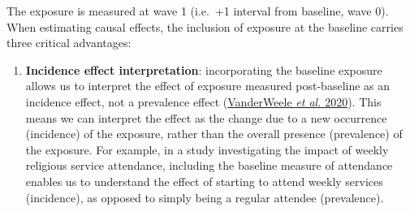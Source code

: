 \documentclass[
  singlecolumn]{article}
\providecommand{\tightlist}{%
  \setlength{\itemsep}{0pt}\setlength{\parskip}{0pt}}\usepackage{longtable,booktabs,array}
\begin{document}
The exposure is measured at wave 1 (i.e.~+1 interval from baseline, wave
0). When estimating causal effects, the inclusion of exposure at the
baseline carries three critical advantages:

\begin{enumerate}
\def\labelenumi{\alph{enumi}.}
\tightlist
\item
  \textbf{Incidence effect interpretation}: incorporating the baseline
  exposure allows us to interpret the effect of exposure measured
  post-baseline as an incidence effect, not a prevalence effect
  (\protect\hyperlink{ref-vanderweele2020}{VanderWeele \emph{et al.}
  2020}). This means we can interpret the effect as the change due to a
  new occurrence (incidence) of the exposure, rather than the overall
  presence (prevalence) of the exposure. For example, in a study
  investigating the impact of weekly religious service attendance,
  including the baseline measure of attendance enables us to understand
  the effect of starting to attend weekly services (incidence), as
  opposed to simply being a regular attendee (prevalence).
\end{enumerate}
\end{document}
